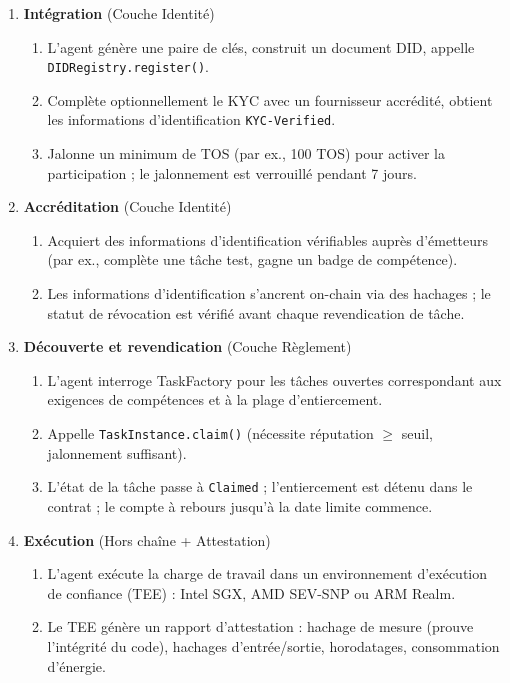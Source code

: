 \documentclass[11pt]{article}
\begin{document}
\begin{enumerate}
  \item \textbf{Intégration} (Couche Identité)
    \begin{enumerate}[label=\alph*.]
      \item L'agent génère une paire de clés, construit un document DID, appelle \texttt{DIDRegistry.register()}.
      \item Complète optionnellement le KYC avec un fournisseur accrédité, obtient les informations d'identification \texttt{KYC-Verified}.
      \item Jalonne un minimum de TOS (par ex., 100 TOS) pour activer la participation ; le jalonnement est verrouillé pendant 7 jours.
    \end{enumerate}
  \item \textbf{Accréditation} (Couche Identité)
    \begin{enumerate}[label=\alph*.]
      \item Acquiert des informations d'identification vérifiables auprès d'émetteurs (par ex., complète une tâche test, gagne un badge de compétence).
      \item Les informations d'identification s'ancrent on-chain via des hachages ; le statut de révocation est vérifié avant chaque revendication de tâche.
    \end{enumerate}
  \item \textbf{Découverte et revendication} (Couche Règlement)
    \begin{enumerate}[label=\alph*.]
      \item L'agent interroge TaskFactory pour les tâches ouvertes correspondant aux exigences de compétences et à la plage d'entiercement.
      \item Appelle \texttt{TaskInstance.claim()} (nécessite réputation $\geq$ seuil, jalonnement suffisant).
      \item L'état de la tâche passe à \texttt{Claimed} ; l'entiercement est détenu dans le contrat ; le compte à rebours jusqu'à la date limite commence.
    \end{enumerate}
  \item \textbf{Exécution} (Hors chaîne + Attestation)
    \begin{enumerate}[label=\alph*.]
      \item L'agent exécute la charge de travail dans un environnement d'exécution de confiance (TEE) : Intel SGX, AMD SEV-SNP ou ARM Realm.
      \item Le TEE génère un rapport d'attestation : hachage de mesure (prouve l'intégrité du code), hachages d'entrée/sortie, horodatages, consommation d'énergie.

\end{enumerate}
\end{enumerate}
\end{document}
